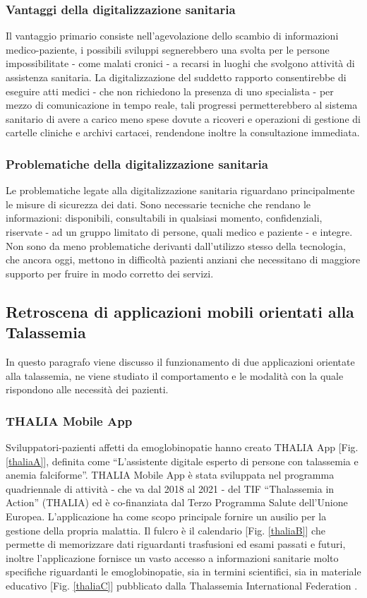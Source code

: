\documentclass[12pt,a4paper,openright,twoside]{report}
\begin{document}
\subsubsection{Vantaggi della digitalizzazione sanitaria}
Il vantaggio primario consiste nell’agevolazione dello scambio di informazioni medico-paziente, i possibili sviluppi segnerebbero una svolta per le persone impossibilitate - come malati cronici - a recarsi in luoghi che svolgono attività di assistenza sanitaria. La digitalizzazione del suddetto rapporto consentirebbe di eseguire atti medici - che non richiedono la presenza di uno specialista - per mezzo di comunicazione in tempo reale, tali progressi permetterebbero al sistema sanitario di avere a carico meno spese dovute a ricoveri e operazioni di gestione di cartelle cliniche e archivi cartacei, rendendone inoltre la consultazione immediata.

\subsubsection{Problematiche della digitalizzazione sanitaria}
Le problematiche legate alla digitalizzazione sanitaria riguardano principalmente le misure di sicurezza dei dati. Sono necessarie tecniche che rendano le informazioni: disponibili, consultabili in qualsiasi momento, confidenziali, riservate - ad un gruppo limitato di persone, quali medico e paziente - e integre.
Non sono da meno problematiche derivanti dall'utilizzo stesso della tecnologia, che ancora oggi, mettono in difficoltà pazienti anziani che necessitano di maggiore supporto per fruire in modo corretto dei servizi.

\subsection{Retroscena di applicazioni mobili orientati alla Talassemia}
In questo paragrafo viene discusso il funzionamento di due applicazioni orientate alla talassemia, ne viene studiato il comportamento e le modalità con la quale rispondono alle necessità dei pazienti.

\subsubsection{THALIA Mobile App}
Sviluppatori-pazienti affetti da emoglobinopatie hanno creato THALIA App [Fig. \ref{thaliaA}], definita come ``L'assistente digitale esperto di persone con talassemia e anemia falciforme''. 
THALIA Mobile App è stata sviluppata nel programma quadriennale di attività - che va dal 2018 al 2021 - del TIF ``Thalassemia in Action'' (THALIA) ed è co-finanziata dal Terzo Programma Salute dell'Unione Europea.
L'applicazione ha come scopo principale fornire un ausilio per la gestione della propria malattia. Il fulcro è il calendario [Fig. \ref{thaliaB}] che permette di memorizzare dati riguardanti trasfusioni ed esami passati e futuri, inoltre l'applicazione fornisce un vasto accesso a informazioni sanitarie molto specifiche riguardanti le emoglobinopatie, sia in termini scientifici, sia in materiale educativo [Fig. \ref{thaliaC}] pubblicato dalla Thalassemia International Federation \cite{tahliaapp}.
\end{document}
